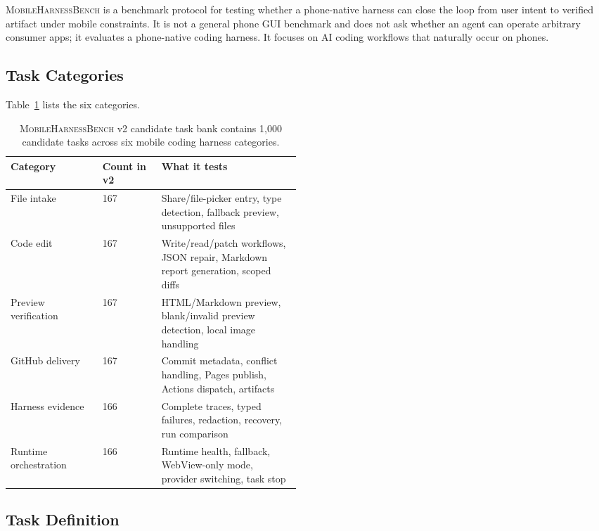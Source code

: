 \documentclass{article}
\newcommand{\mhb}{\textsc{MobileHarnessBench}}
\begin{document}
\mhb{} is a benchmark protocol for testing whether a phone-native harness can close the loop from user intent to verified artifact under mobile constraints.
It is not a general phone GUI benchmark and does not ask whether an agent can operate arbitrary consumer apps; it evaluates a phone-native coding harness.
It focuses on AI coding workflows that naturally occur on phones.

\subsection{Task Categories}

Table~\ref{tab:categories} lists the six categories.

\begin{table}[t]
\centering
\small
\begin{tabular}{llp{0.48\linewidth}}
\toprule
Category & Count in v2 & What it tests \\
\midrule
File intake & 167 & Share/file-picker entry, type detection, fallback preview, unsupported files \\
Code edit & 167 & Write/read/patch workflows, JSON repair, Markdown report generation, scoped diffs \\
Preview verification & 167 & HTML/Markdown preview, blank/invalid preview detection, local image handling \\
GitHub delivery & 167 & Commit metadata, conflict handling, Pages publish, Actions dispatch, artifacts \\
Harness evidence & 166 & Complete traces, typed failures, redaction, recovery, run comparison \\
Runtime orchestration & 166 & Runtime health, fallback, WebView-only mode, provider switching, task stop \\
\bottomrule
\end{tabular}
\caption{\mhb{} v2 candidate task bank contains 1,000 candidate tasks across six mobile coding harness categories.}
\label{tab:categories}
\end{table}

\subsection{Task Definition}
\end{document}
